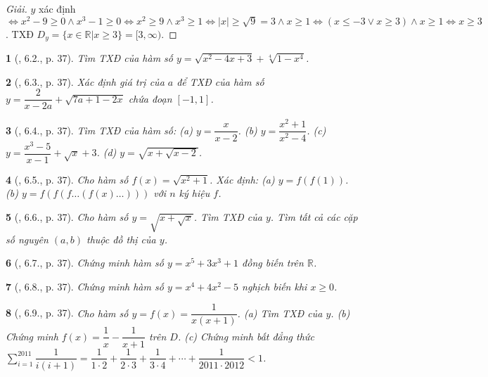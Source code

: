 \documentclass{article}
\newtheorem{baitoan}{}
\begin{document}
\begin{proof}[Giải]
	$y$ xác định $\Leftrightarrow x^2 - 9\ge0\land x^3 - 1\ge0\Leftrightarrow x^2\ge9\land x^3\ge1\Leftrightarrow|x|\ge\sqrt{9} = 3\land x\ge1\Leftrightarrow(x\le-3\lor x\ge3)\land x\ge1\Leftrightarrow x\ge 3$. TXĐ $D_y = \{x\in\mathbb{R}|x\ge3\} = [3,\infty)$.
\end{proof}

\begin{baitoan}[\cite{TLCT_THCS_Toan_9_dai_so}, 6.2., p. 37]
	Tìm {\rm TXĐ} của hàm số $y = \sqrt{x^2 - 4x + 3} + \sqrt[4]{1 - x^4}$.
\end{baitoan}

\begin{baitoan}[\cite{TLCT_THCS_Toan_9_dai_so}, 6.3., p. 37]
	Xác định giá trị của $a$ để {\rm TXĐ} của hàm số $y = \dfrac{2}{x - 2a} + \sqrt{7a + 1 - 2x}$ chứa đoạn $[-1,1]$.
\end{baitoan}

\begin{baitoan}[\cite{TLCT_THCS_Toan_9_dai_so}, 6.4., p. 37]
	Tìm {\rm TXĐ} của hàm số: (a) $y = \dfrac{x}{x - 2}$. (b) $y = \dfrac{x^2 + 1}{x^2 - 4}$. (c) $y = \dfrac{x^3 - 5}{x - 1} + \sqrt{x} + 3$. (d) $y = \sqrt{x + \sqrt{x - 2}}$.
\end{baitoan}

\begin{baitoan}[\cite{TLCT_THCS_Toan_9_dai_so}, 6.5., p. 37]
	Cho hàm số $f(x) = \sqrt{x^2 + 1}$. Xác định: (a) $y = f(f(1))$. (b) $y = f(f(f\ldots(f(x)\ldots)))$ với $n$ ký hiệu $f$.
\end{baitoan}

\begin{baitoan}[\cite{TLCT_THCS_Toan_9_dai_so}, 6.6., p. 37]
	Cho hàm số $y = \sqrt{x + \sqrt{x}}$. Tìm {\rm TXĐ} của $y$. Tìm tất cả các cặp số nguyên $(a,b)$ thuộc đồ thị của $y$.
\end{baitoan}

\begin{baitoan}[\cite{TLCT_THCS_Toan_9_dai_so}, 6.7., p. 37]
	Chứng minh hàm số $y = x^5 + 3x^3 + 1$ đồng biến trên $\mathbb{R}$.
\end{baitoan}

\begin{baitoan}[\cite{TLCT_THCS_Toan_9_dai_so}, 6.8., p. 37]
	Chứng minh hàm số $y = x^4 + 4x^2 - 5$ nghịch biến khi $x\ge0$.
\end{baitoan}

\begin{baitoan}[\cite{TLCT_THCS_Toan_9_dai_so}, 6.9., p. 37]
	Cho hàm số $y = f(x) = \dfrac{1}{x(x + 1)}$. (a) Tìm {\rm TXĐ} của $y$. (b) Chứng minh $f(x) = \dfrac{1}{x} - \dfrac{1}{x + 1}$ trên $D$. (c) Chứng minh bất đẳng thức $\sum_{i=1}^{2011} \dfrac{1}{i(i + 1)} = \dfrac{1}{1\cdot2} + \dfrac{1}{2\cdot3} + \dfrac{1}{3\cdot4} + \cdots + \dfrac{1}{2011\cdot2012} < 1$.
\end{baitoan}
\end{document}
